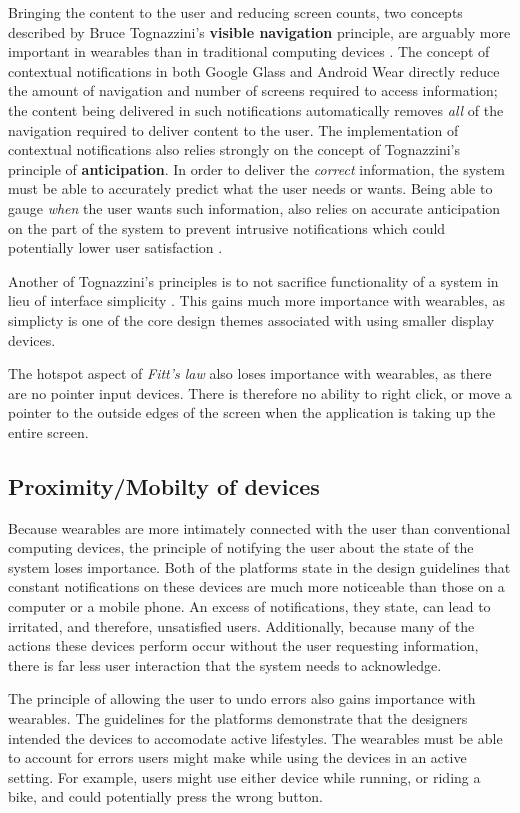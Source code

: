 \documentclass[12pt]{article}
\begin{document}
Bringing the content to the user and reducing screen counts, two concepts described by Bruce Tognazzini's \textbf{visible navigation} principle, are arguably more important in wearables than in traditional computing devices \cite{tog}. The concept of contextual notifications in both Google Glass and Android Wear directly reduce the amount of navigation and number of screens required to access information; the content being delivered in such notifications automatically removes \textit{all} of the navigation required to deliver content to the user. The implementation of contextual notifications also relies strongly on the concept of Tognazzini's principle of \textbf{anticipation}. In order to deliver the \textit{correct} information, the system must be able to accurately predict what the user needs or wants. Being able to gauge \textit{when} the user wants such information, also relies on accurate anticipation on the part of the system to prevent intrusive notifications which could potentially lower user satisfaction \cite{tog}.

Another of Tognazzini's principles is to not sacrifice functionality of a system in lieu of interface simplicity \cite{tog}. This gains much more importance with wearables, as simplicty is one of the core design themes associated with using smaller display devices.

The hotspot aspect of \textit{Fitt's law} also loses importance with wearables, as there are no pointer input devices. There is therefore no ability to right click, or move a pointer to the outside edges of the screen when the application is taking up the entire screen.

\subsection{Proximity/Mobilty of devices}
Because wearables are more intimately connected with the user than conventional computing devices, the principle of notifying the user about the state of the system loses importance. Both of the platforms state in the design guidelines that constant notifications on these devices are much more noticeable than those on a computer or a mobile phone. An excess of notifications, they state, can lead to irritated, and therefore, unsatisfied users. Additionally, because many of the actions these devices perform occur without the user requesting information, there is far less user interaction that the system needs to acknowledge. 

The principle of allowing the user to undo errors also gains importance with wearables. The guidelines for the platforms demonstrate that the designers intended the devices to accomodate active lifestyles.  The wearables must be able to account for errors users might make while using the devices in an active setting. For example, users might use either device while running, or riding a bike, and could potentially press the wrong button.
\end{document}
